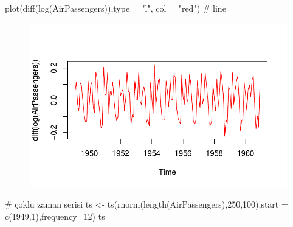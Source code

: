 \documentclass[
  letterpaper,
  DIV=11,
  numbers=noendperiod]{scrreprt}
\newenvironment{Shaded}{\begin{snugshade}}{\end{snugshade}}
\newcommand{\AttributeTok}[1]{\textcolor[rgb]{0.40,0.45,0.13}{#1}}
\newcommand{\CommentTok}[1]{\textcolor[rgb]{0.37,0.37,0.37}{#1}}
\newcommand{\DecValTok}[1]{\textcolor[rgb]{0.68,0.00,0.00}{#1}}
\newcommand{\FunctionTok}[1]{\textcolor[rgb]{0.28,0.35,0.67}{#1}}
\newcommand{\NormalTok}[1]{\textcolor[rgb]{0.00,0.23,0.31}{#1}}
\newcommand{\OtherTok}[1]{\textcolor[rgb]{0.00,0.23,0.31}{#1}}
\newcommand{\StringTok}[1]{\textcolor[rgb]{0.13,0.47,0.30}{#1}}
\begin{document}
\begin{Shaded}
\begin{Highlighting}[]
\FunctionTok{plot}\NormalTok{(}\FunctionTok{diff}\NormalTok{(}\FunctionTok{log}\NormalTok{(AirPassengers)),}\AttributeTok{type =} \StringTok{"l"}\NormalTok{, }\AttributeTok{col =} \StringTok{"red"}\NormalTok{) }\CommentTok{\# line}
\end{Highlighting}
\end{Shaded}

\begin{figure}[H]

{\centering \includegraphics{data_analysis_files/figure-pdf/unnamed-chunk-5-6.pdf}

}

\end{figure}

\begin{Shaded}
\begin{Highlighting}[]
\CommentTok{\# çoklu zaman serisi}
\NormalTok{ts }\OtherTok{\textless{}{-}} \FunctionTok{ts}\NormalTok{(}\FunctionTok{rnorm}\NormalTok{(}\FunctionTok{length}\NormalTok{(AirPassengers),}\DecValTok{250}\NormalTok{,}\DecValTok{100}\NormalTok{),}\AttributeTok{start =} \FunctionTok{c}\NormalTok{(}\DecValTok{1949}\NormalTok{,}\DecValTok{1}\NormalTok{),}\AttributeTok{frequency=}\DecValTok{12}\NormalTok{)}
\NormalTok{ts}
\end{Highlighting}
\end{Shaded}
\end{document}
